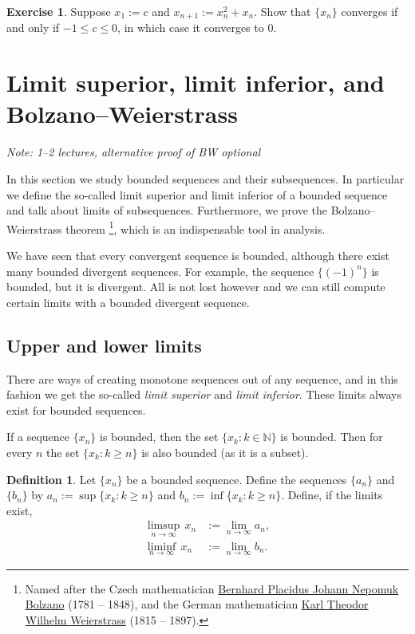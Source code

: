 \documentclass[12pt]{book}
\newcommand{\N}{{\mathbb{N}}}
\newcommand{\myindex}[1]{#1\index{#1}}
\newcommand{\sectionnotes}[1]{\noindent \emph{Note: #1} \medskip \par}
\newcommand{\sectionnewpage}{\clearpage}
\theoremstyle{plain}
\theoremstyle{remark}
\theoremstyle{definition}
\newtheorem{defn}[thm]{Definition}
\theoremstyle{exercise}
\newtheorem{exercise}{Exercise}[section]
\theoremstyle{example}
\begin{document}
\begin{exercise} \label{exercise:convergentinitialvalues}
Suppose $x_1 := c$ and $x_{n+1} := x_n^2+x_n$.
Show that $\{ x_n \}$ converges if and only if $-1 \leq c \leq 0$, in which
case it converges to 0.
\end{exercise}


\sectionnewpage
\section{Limit superior, limit inferior, and Bolzano--Weierstrass}
\label{sec:bw}

\sectionnotes{1--2 lectures, alternative proof of BW optional}

In this section we study bounded sequences and their subsequences.
In particular we define the so-called limit superior and limit inferior
of a bounded sequence and talk about limits of subsequences.
Furthermore, we prove the
Bolzano--Weierstrass theorem%
\footnote{%
Named after the Czech mathematician
\href{http://en.wikipedia.org/wiki/Bernard_Bolzano}{Bernhard Placidus Johann Nepomuk Bolzano}
(1781 -- 1848), and the German mathematician
\href{http://en.wikipedia.org/wiki/Karl_Weierstrass}{Karl Theodor Wilhelm Weierstrass}
(1815 -- 1897).}, which is an
indispensable tool in analysis.

We have seen that every convergent sequence is bounded,
although there exist many bounded divergent sequences.  For example,
the sequence $\{ {(-1)}^n \}$ is bounded,
but it is divergent.  All is not lost however and we can
still compute certain limits with a bounded divergent sequence.

\subsection{Upper and lower limits}

There are ways of creating monotone sequences out of any sequence, and
in this fashion we
get the so-called \emph{\myindex{limit superior}} and
\emph{\myindex{limit inferior}}.  These limits always exist for bounded
sequences.

If a sequence $\{ x_n \}$ is bounded, then 
the set $\{ x_k : k \in \N \}$ is bounded.  Then for every $n$
the set $\{ x_k : k \geq n \}$ is also bounded (as it is a subset).

\begin{defn} \label{liminflimsup:def}
Let $\{ x_n \}$ be a bounded sequence.  Define the sequences $\{ a_n \}$
and $\{ b_n \}$ by
$a_n := \sup \{ x_k : k \geq n \}$ and
$b_n := \inf \{ x_k : k \geq n \}$.  
Define, if the limits exist,
\begin{align*}
\limsup_{n \to \infty} \, x_n & := \lim_{n \to \infty} a_n ,
\\
\liminf_{n \to \infty} \, x_n & := \lim_{n \to \infty} b_n .
\end{align*}
\end{defn}
\end{document}
